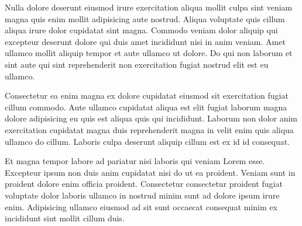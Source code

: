 \documentclass[a4paper,10pt,french]{sphinxmanual}
\begin{document}
Nulla dolore deserunt eiusmod irure exercitation aliqua mollit culpa sint veniam magna quis enim mollit adipisicing aute nostrud. Aliqua voluptate quis cillum aliqua irure dolor cupidatat sint magna. Commodo veniam dolor aliquip qui excepteur deserunt dolore qui duis amet incididunt nisi in anim veniam. Amet ullamco mollit aliquip tempor et aute ullamco ut dolore. Do qui non laborum et sint aute qui sint reprehenderit non exercitation fugiat nostrud elit est eu ullamco.

Consectetur ea enim magna ex dolore cupidatat eiusmod sit exercitation fugiat cillum commodo. Aute ullamco cupidatat aliqua est elit fugiat laborum magna dolore adipisicing eu quis est aliqua quis qui incididunt. Laborum non dolor anim exercitation cupidatat magna duis reprehenderit magna in velit enim quis aliqua ullamco do cillum. Laboris culpa deserunt aliquip cillum est ex id id consequat.

Et magna tempor labore ad pariatur nisi laboris qui veniam Lorem esse. Excepteur ipsum non duis anim cupidatat nisi do ut ea proident. Veniam sunt in proident dolore enim officia proident. Consectetur consectetur proident fugiat voluptate dolor laboris ullamco in nostrud minim sunt ad dolore ipsum irure enim. Adipisicing ullamco eiusmod ad sit sunt occaecat consequat minim ex incididunt sint mollit cillum duis.



\renewcommand{\indexname}{Index}
\footnotesize\raggedright\printindex
\end{document}
